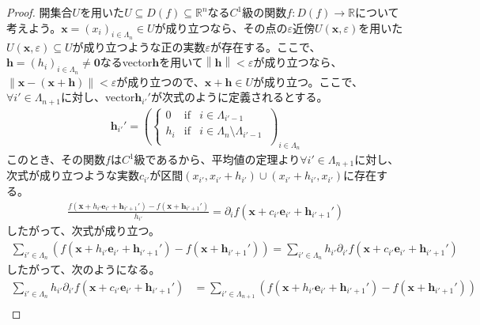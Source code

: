 \documentclass[dvipdfmx]{jsarticle}
\begin{document}
\begin{proof}
開集合$U$を用いた$U \subseteq D(f) \subseteq \mathbb{R}^{n}$なる$C^{1}$級の関数$f:D(f) \rightarrow \mathbb{R}$について考えよう。$\mathbf{x} = \left( x_{i} \right)_{i \in \varLambda_{n}} \in U$が成り立つなら、その点の$\varepsilon$近傍$U\left( \mathbf{x},\varepsilon \right)$を用いた$U\left( \mathbf{x},\varepsilon \right) \subseteq U$が成り立つような正の実数$\varepsilon$が存在する。ここで、$\mathbf{h} = \left( h_{i} \right)_{i \in \varLambda_{n}} \neq \mathbf{0}$なるvector$\mathbf{h}$を用いて$\left\| \mathbf{h} \right\| < \varepsilon$が成り立つなら、$\left\| \mathbf{x} - \left( \mathbf{x} + \mathbf{h} \right) \right\| < \varepsilon$が成り立つので、$\mathbf{x} + \mathbf{h} \in U$が成り立つ。ここで、$\forall i' \in \varLambda_{n + 1}$に対し、vector$\mathbf{h}_{i'}'$が次式のように定義されるとする。
\begin{align*}
\mathbf{h}_{i'}' = \left( \left\{ \begin{matrix}
0 & \mathrm{if} & i \in \varLambda_{i' - 1} \\
h_{i} & \mathrm{if} & i \in \varLambda_{n} \setminus \varLambda_{i' - 1} \\
\end{matrix} \right.\  \right)_{i \in \varLambda_{n}}
\end{align*}
このとき、その関数$f$は$C^{1}$級であるから、平均値の定理より$\forall i' \in \varLambda_{n + 1}$に対し、次式が成り立つような実数$c_{i'}$が区間$\left( x_{i'},x_{i'} + h_{i'} \right) \cup \left( x_{i'} + h_{i'},x_{i'} \right)$に存在する。
\begin{align*}
\frac{f\left( \mathbf{x} + h_{i'}\mathbf{e}_{i'} + \mathbf{h}_{i' + 1}' \right) - f\left( \mathbf{x} + \mathbf{h}_{i' + 1}' \right)}{h_{i'}} = \partial_{i}f\left( \mathbf{x} + c_{i'}\mathbf{e}_{i'} + \mathbf{h}_{i' + 1}' \right)
\end{align*}
したがって、次式が成り立つ。
\begin{align*}
\sum_{i' \in \varLambda_{n}} \left( f\left( \mathbf{x} + h_{i'}\mathbf{e}_{i'} + \mathbf{h}_{i' + 1}' \right) - f\left( \mathbf{x} + \mathbf{h}_{i' + 1}' \right) \right) = \sum_{i' \in \varLambda_{n}} {h_{i'}\partial_{i'}f\left( \mathbf{x} + c_{i'}\mathbf{e}_{i'} + \mathbf{h}_{i' + 1}' \right)}
\end{align*}
したがって、次のようになる。
\begin{align*}
\sum_{i' \in \varLambda_{n}} {h_{i'}\partial_{i'}f\left( \mathbf{x} + c_{i'}\mathbf{e}_{i'} + \mathbf{h}_{i' + 1}' \right)} &= \sum_{i' \in \varLambda_{n + 1}} \left( f\left( \mathbf{x} + h_{i'}\mathbf{e}_{i'} + \mathbf{h}_{i' + 1}' \right) - f\left( \mathbf{x} + \mathbf{h}_{i' + 1}' \right) \right)\\

\end{align*}
\end{proof}
\end{document}
